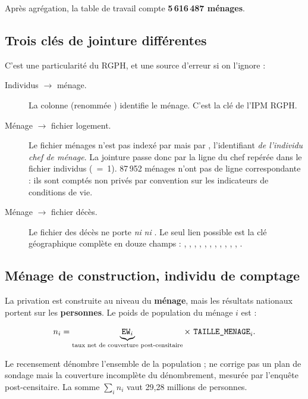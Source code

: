 \documentclass[11pt,a4paper]{article}
\begin{document}
Après agrégation, la table de travail compte \textbf{5\,616\,487 ménages}.

\subsection{Trois clés de jointure différentes}

C'est une particularité du RGPH, et une source d'erreur si on l'ignore :

\begin{description}
  \item[Individus $\rightarrow$ ménage.] La colonne  (renommée
  ) identifie le ménage. C'est la clé de l'IPM RGPH.

  \item[Ménage $\rightarrow$ fichier logement.] Le fichier ménages n'est pas indexé par
   mais par , l'identifiant \emph{de l'individu chef de ménage}.
  La jointure passe donc par la ligne du chef repérée dans le fichier individus
  (~=~1). 87\,952 ménages n'ont pas de ligne correspondante : ils sont comptés non
  privés par convention sur les indicateurs de conditions de vie.

  \item[Ménage $\rightarrow$ fichier décès.] Le fichier des décès ne porte \emph{ni}
   \emph{ni} . Le seul lien possible est la clé géographique
  complète en douze champs : , , , ,
  , , , , , , , .
\end{description}

\subsection{Ménage de construction, individu de comptage}

La privation est construite au niveau du \textbf{ménage}, mais les résultats nationaux portent
sur les \textbf{personnes}. Le poids de population du ménage $i$ est :

\[
  n_i = \underbrace{\texttt{EW}_i}_{\text{taux net de couverture post-censitaire}}
        \times\ \texttt{TAILLE\_MENAGE}_i .
\]

Le recensement dénombre l'ensemble de la population ;  ne corrige pas un plan de
sondage mais la couverture incomplète du dénombrement, mesurée par l'enquête
post-censitaire. La somme $\sum_i n_i$ vaut 29,28 millions de personnes.
\end{document}
